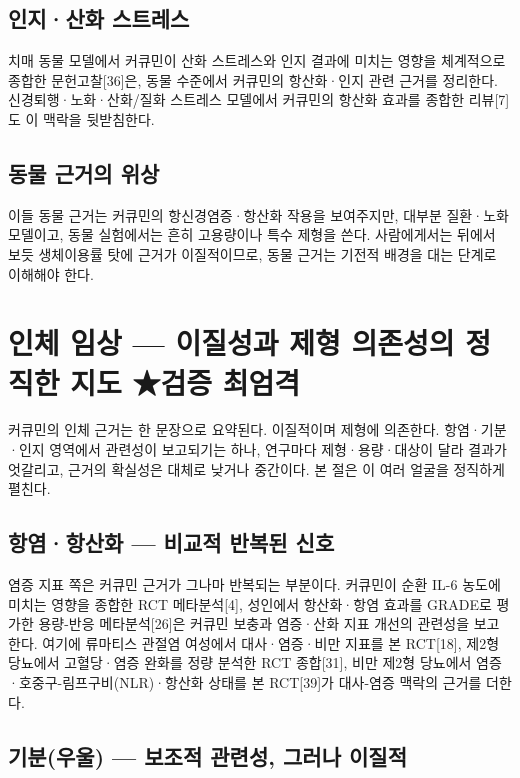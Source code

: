 \documentclass[12pt,oneside]{book}
\begin{document}
\subsection{인지·산화 스트레스}

치매 동물 모델에서 커큐민이 산화 스트레스와 인지 결과에 미치는 영향을 체계적으로 종합한 문헌고찰[36]은, 동물 수준에서 커큐민의 항산화·인지 관련 근거를 정리한다. 신경퇴행·노화·산화/질화 스트레스 모델에서 커큐민의 항산화 효과를 종합한 리뷰[7]도 이 맥락을 뒷받침한다.

\subsection{동물 근거의 위상}

이들 동물 근거는 커큐민의 항신경염증·항산화 작용을 보여주지만, 대부분 질환·노화 모델이고, 동물 실험에서는 흔히 고용량이나 특수 제형을 쓴다. 사람에게서는 뒤에서 보듯 생체이용률 탓에 근거가 이질적이므로, 동물 근거는 기전적 배경을 대는 단계로 이해해야 한다.

\section{인체 임상 — 이질성과 제형 의존성의 정직한 지도 ★검증 최엄격}

커큐민의 인체 근거는 한 문장으로 요약된다. 이질적이며 제형에 의존한다. 항염·기분·인지 영역에서 관련성이 보고되기는 하나, 연구마다 제형·용량·대상이 달라 결과가 엇갈리고, 근거의 확실성은 대체로 낮거나 중간이다. 본 절은 이 여러 얼굴을 정직하게 펼친다.

\subsection{항염·항산화 — 비교적 반복된 신호}

염증 지표 쪽은 커큐민 근거가 그나마 반복되는 부분이다. 커큐민이 순환 IL-6 농도에 미치는 영향을 종합한 RCT 메타분석[4], 성인에서 항산화·항염 효과를 GRADE로 평가한 용량-반응 메타분석[26]은 커큐민 보충과 염증·산화 지표 개선의 관련성을 보고한다. 여기에 류마티스 관절염 여성에서 대사·염증·비만 지표를 본 RCT[18], 제2형 당뇨에서 고혈당·염증 완화를 정량 분석한 RCT 종합[31], 비만 제2형 당뇨에서 염증·호중구-림프구비(NLR)·항산화 상태를 본 RCT[39]가 대사-염증 맥락의 근거를 더한다.

\subsection{기분(우울) — 보조적 관련성, 그러나 이질적}
\end{document}
